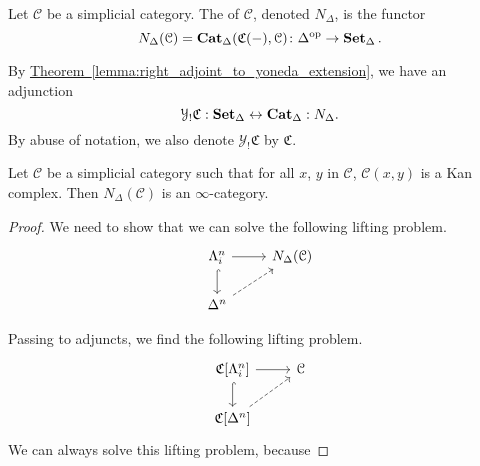 \documentclass[main.tex]{subfiles}
\begin{document}
\begin{definition}
  \label{def:simplicial_nerve}
  Let $\mathcal{C}$ be a simplicial category. The  of $\mathcal{C}$, denoted $N_{\Delta}$, is the functor
  \begin{equation*}
    N_{\Delta}(\mathcal{C}) = \mathbf{Cat}_{\Delta}(\mathfrak{C}(-), \mathcal{C})\colon \Delta^{\mathrm{op}} \to \operatorname{\mathbf{Set}_{\Delta}}.
  \end{equation*}
\end{definition}

By \hyperref[lemma:right_adjoint_to_yoneda_extension]{Theorem~\ref*{lemma:right_adjoint_to_yoneda_extension}}, we have an adjunction
\begin{equation*}
  \mathcal{Y}_{!}\mathfrak{C} : \operatorname{\mathbf{Set}_{\Delta}} \leftrightarrow \operatorname{\mathbf{Cat}_{\Delta}} : N_{\Delta}.
\end{equation*}
By abuse of notation, we also denote $\mathcal{Y}_{!}\mathfrak{C}$ by $\mathfrak{C}$.

\begin{proposition}
  \label{prop:simplicial_nerve_of_category_enriched_in_kan_complexes_gives_infinity_category}
  Let $\mathcal{C}$ be a simplicial category such that for all $x$, $y$ in $\mathcal{C}$, $\mathcal{C}(x, y)$ is a Kan complex. Then $N_{\Delta}( \mathcal{C} )$ is an $\infty$-category.
\end{proposition}
\begin{proof}
  We need to show that we can solve the following lifting problem.
  \begin{equation*}
    \begin{tikzcd}
      \Lambda^{n}_{i}
      \arrow[r]
      \arrow[d, hookrightarrow]
      & N_{\Delta}(\mathcal{C})
      \\
      \Delta^{n}
      \arrow[ur, dashed]
    \end{tikzcd}
  \end{equation*}

  Passing to adjuncts, we find the following lifting problem.
  \begin{equation*}
    \begin{tikzcd}
      \mathfrak{C}[\Lambda^{n}_{i}]
      \arrow[r]
      \arrow[d, hookrightarrow]
      & \mathcal{C}
      \\
      \mathfrak{C}[\Delta^{n}]
      \arrow[ur, dashed]
    \end{tikzcd}
  \end{equation*}
  We can always solve this lifting problem, because
\end{proof}
\end{document}
